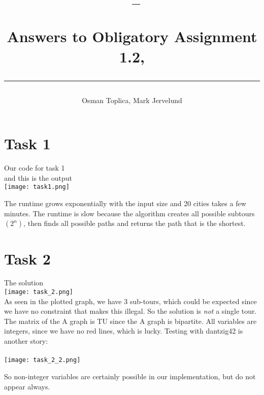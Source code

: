 \documentclass[a4paper,10pt]{article}
\title{\begin{flushleft}
\vspace{-4ex}
\courseid~-- \coursename \\[0.2cm]
{\Large Answers to Obligatory Assignment 1.2, \term \\[3ex]
\hrule}
\end{flushleft}
}
\date{}
\author{Osman Toplica, Mark Jervelund}
\begin{document}
\maketitle

\section*{Task 1}
Our code for task 1\\


and this is the output\\
\texttt{[image: task1.png]}

The runtime grows exponentially with the input size and 20 cities takes a few minutes. The runtime is slow because the algorithm creates all possible subtours $(2^n)$, then finds all possible paths and returns the path that is the shortest.
\newpage


\section*{Task 2}

The solution\\
\texttt{[image: task\_2.png]}
\\

As seen in the plotted graph, we have 3 sub-tours, which could be expected since we have no constraint that makes this illegal. So the solution is \emph{not} a single tour. The matrix of the A graph is TU since the A graph is bipartite. All variables are integers, since we have no red lines, which is lucky. Testing with dantzig42 is another story:\\
\\
\texttt{[image: task\_2\_2.png]}

So non-integer variables are certainly possible in our implementation, but do not appear always.

\newpage
\end{document}
